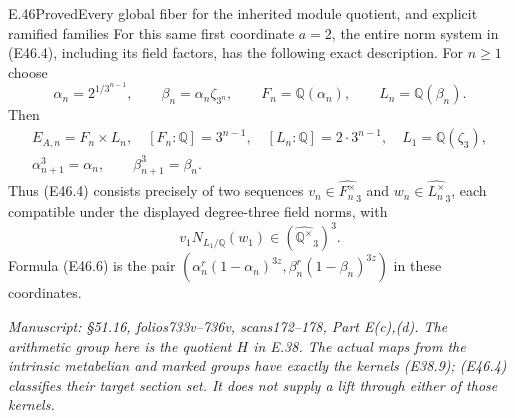 \begin{statement}{E.46}{Proved}{Every global fiber for the inherited module quotient, and explicit ramified families}
For this same first coordinate $a=2$, the entire
norm system in (E46.4), including its field factors,
has the following exact description. For $n\geq1$
choose
\[
 \alpha_n=2^{1/3^{n-1}},\qquad
 \beta_n=\alpha_n\zeta_{3^n},\qquad
 F_n=\mathbb Q(\alpha_n),\qquad L_n=\mathbb Q(\beta_n).
 \tag{E46.9}
\]
Then
\[
 \begin{gathered}
 E_{A,n}=F_n\times L_n,
 \quad [F_n:\mathbb Q]=3^{n-1},
 \quad [L_n:\mathbb Q]=2\cdot3^{n-1},\quad
 L_1=\mathbb Q(\zeta_3),\\
 \alpha_{n+1}^3=\alpha_n,\qquad
 \beta_{n+1}^3=\beta_n .
 \end{gathered}                                          \tag{E46.10}
\]
Thus (E46.4) consists precisely of two sequences
$v_n\in\widehat{F_n^\times}_3$ and
$w_n\in\widehat{L_n^\times}_3$, each compatible under
the displayed degree-three field norms, with
\[
               v_1 N_{L_1/\mathbb Q}(w_1)
                         \in(\widehat{\mathbb Q^\times}_3)^3.
 \tag{E46.11}
\]
Formula (E46.6) is the pair
$(\alpha_n^r(1-\alpha_n)^{3z},
\beta_n^r(1-\beta_n)^{3z})$ in these coordinates.

\emph{Manuscript: \S51.16, folios733v--736v,
scans172--178, Part E(c),(d). The arithmetic group here
is the quotient $H$ in E.38. The actual maps from the
intrinsic metabelian and marked groups have exactly
the kernels (E38.9); (E46.4) classifies their target
section set. It does not supply a lift through either
of those kernels.}
\end{statement}
